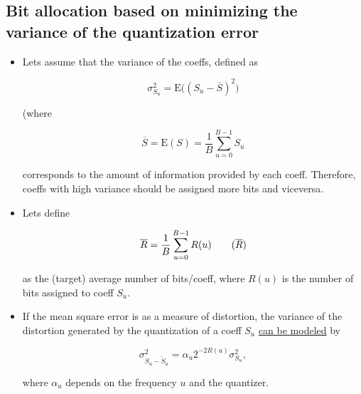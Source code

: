     \hypertarget{bit-allocation-based-on-minimizing-the-variance-of-the-quantization-error}{%
\subsection{Bit allocation based on minimizing the variance of the
quantization
error}\label{bit-allocation-based-on-minimizing-the-variance-of-the-quantization-error}}

\begin{itemize}
\item
  Lets assume that the variance of the coeffs, defined as

  \begin{equation}
    \sigma_{S_u}^2 = \text{E}\big( (S_u - \overline{S})^2\big)
   \end{equation}

  (where

  \begin{equation}
     \overline{S} = \text{E}(S) = \frac{1}{B}\sum_{u=0}^{B-1} S_u
   \end{equation}

  corresponds to the amount of information provided by each coeff.
  Therefore, coeffs with high variance should be assigned more bits and
  viceversa.
\item
  Lets define

  \begin{equation}
    {\overline{R}} = \frac{1}{B}\sum_{u=0}^{B-1}R(u)
    \tag{$\overline{R}$}
  \end{equation}

  as the (target) average number of bits/coeff, where \(R(u)\) is the
  number of bits assigned to coeff \(S_u\).
\item
  If the mean square error is as a measure of distortion, the variance
  of the distortion generated by the quantization of a coeff \(S_u\)
  \href{http://cdn.intechopen.com/pdfs/16267/InTech-Rate_control_in_video_coding.pdf}{can
  be modeled} by

  \begin{equation}
    \sigma_{S_u-\tilde{S}_u}^2=\alpha_{u}2^{-2R(u)}\sigma_{S_u}^2,
  \end{equation}

  where \(\alpha_{u}\) depends on the frequency \(u\) and the quantizer.
\end{itemize}

